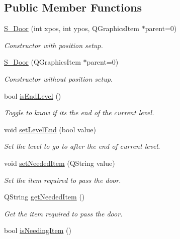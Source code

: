 \subsection*{Public Member Functions}
\begin{DoxyCompactItemize}
\item 
\hyperlink{class_s___door_ae80fd04e83a8fe65009011cd670d2a15}{S\+\_\+\+Door} (int xpos, int ypos, Q\+Graphics\+Item $\ast$parent=0)
\begin{DoxyCompactList}\small\item\em Constructor with position setup. \end{DoxyCompactList}\item 
\hyperlink{class_s___door_a439f7ffa4b9d9e0f5fcd943632e6ed56}{S\+\_\+\+Door} (Q\+Graphics\+Item $\ast$parent=0)
\begin{DoxyCompactList}\small\item\em Constructor without position setup. \end{DoxyCompactList}\item 
bool \hyperlink{class_s___door_a1b9a90f11a9cf518b75e7acffa893dfd}{is\+End\+Level} ()
\begin{DoxyCompactList}\small\item\em Toggle to know if it\textquotesingle{}s the end of the current level. \end{DoxyCompactList}\item 
void \hyperlink{class_s___door_a26862c2936b36f61027053de131870df}{set\+Level\+End} (bool value)
\begin{DoxyCompactList}\small\item\em Set the level to go to after the end of current level. \end{DoxyCompactList}\item 
void \hyperlink{class_s___door_a66ca6768a47d506c329f330d71e51a40}{set\+Needed\+Item} (Q\+String value)
\begin{DoxyCompactList}\small\item\em Set the item required to pass the door. \end{DoxyCompactList}\item 
Q\+String \hyperlink{class_s___door_ad4388cca8328240695a92b7fad85ff68}{get\+Needed\+Item} ()
\begin{DoxyCompactList}\small\item\em Get the item required to pass the door. \end{DoxyCompactList}\item 
bool \hyperlink{class_s___door_ac78b4d02bc14f134ab8040c4610261b5}{is\+Needing\+Item} ()

\end{DoxyCompactItemize}
